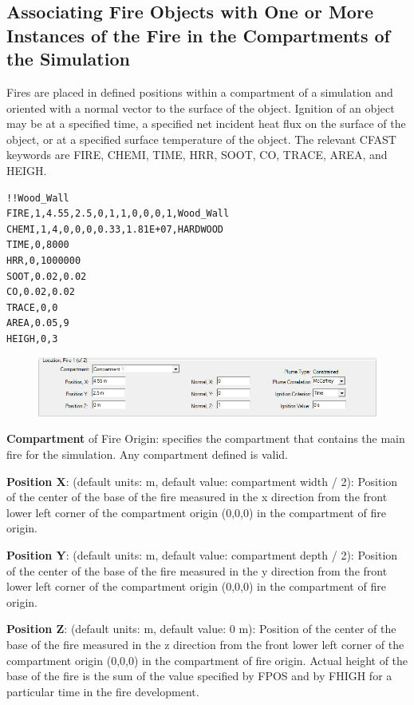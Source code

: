 \subsection{Associating Fire Objects with One or More Instances of the Fire in the Compartments of the Simulation}

Fires  are placed in defined positions within a compartment of a simulation and oriented with a normal vector to the surface of the object.  Ignition of an object may be at a specified time, a specified net incident heat flux on the surface of the object, or at a specified surface temperature of the object. The relevant CFAST keywords are FIRE, CHEMI, TIME, HRR, SOOT, CO, TRACE, AREA, and HEIGH.

\begin{lstlisting}
!!Wood_Wall
FIRE,1,4.55,2.5,0,1,1,0,0,0,1,Wood_Wall
CHEMI,1,4,0,0,0,0.33,1.81E+07,HARDWOOD
TIME,0,8000
HRR,0,1000000
SOOT,0.02,0.02
CO,0.02,0.02
TRACE,0,0
AREA,0.05,9
HEIGH,0,3
\end{lstlisting}

\begin{figure}[h!]
\begin{center}
\includegraphics[width=6.5in]{FIGURES/Input_File/Fire_Positioning}
\end{center}
\end{figure}

\textbf{Compartment} of Fire Origin: specifies the compartment that contains the main fire for the simulation.  Any compartment defined is valid.

\textbf{Position X}: (default units: m, default value: compartment width / 2): Position of the center of the base of the fire measured in the x direction from the front lower left corner of the compartment origin (0,0,0) in the compartment of fire origin.

\textbf{Position Y}: (default units: m, default value: compartment depth / 2): Position of the center of the base of the fire measured in the y direction from the front lower left corner of the compartment origin (0,0,0) in the compartment of fire origin.

\textbf{Position Z}: (default units: m, default value: 0 m): Position of the center of the base of the fire measured in the z direction from the front lower left corner of the compartment origin (0,0,0) in the compartment of fire origin. Actual height of the base of the fire is the sum of the value specified by FPOS and by FHIGH for a particular time in the fire development.

